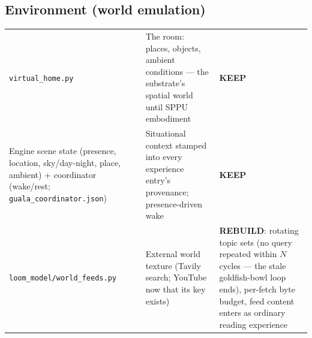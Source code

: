 \documentclass[11pt]{article}
\newcommand{\keep}{\textbf{KEEP}}
\newcommand{\rebuild}{\textbf{REBUILD}}
\begin{document}
\subsection{Environment (world emulation)}
\begin{longtable}{p{} p{} p{}}
\toprule
\texttt{virtual\_home.py} &
The room: places, objects, ambient conditions — the substrate's spatial
world until SPPU embodiment &
\keep{} \\
Engine scene state (presence, location, sky/day-night, place, ambient) +
coordinator (wake/rest; \texttt{guala\_coordinator.json}) &
Situational context stamped into every experience entry's provenance;
presence-driven wake &
\keep{} \\
\texttt{loom\_model/world\_feeds.py} &
External world texture (Tavily search; YouTube now that its key exists) &
\rebuild{}: rotating topic sets (no query repeated within $N$ cycles — the
stale goldfish-bowl loop ends), per-fetch byte budget, feed content enters
as ordinary reading experience \\
\bottomrule
\end{longtable}
\end{document}
